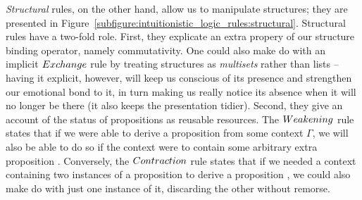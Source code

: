\textit{Structural} rules, on the other hand, allow us to manipulate structures; they are presented in Figure~\ref{subfigure:intuitionistic_logic_rules:structural}.
Structural rules have a two-fold role.
First, they explicate an extra propery of our structure binding operator, namely commutativity.
One could also make do with an implicit $Exchange{}$ rule by treating structures as \textit{multisets} rather than lists -- having it explicit, however, will keep us conscious of its presence and strengthen our emotional bond to it, in turn making us really notice its absence when it will no longer be there (it also keeps the presentation tidier).
Second, they give an account of the status of propositions as reusable resources.
The $Weakening{}$ rule states that if we were able to derive a proposition  from some context $\Gamma$, we will also be able to do so if the context were to contain some arbitrary extra proposition .
Conversely, the $Contraction{}$ rule states that if we needed a context containing two instances of a proposition  to derive a proposition , we could also make do with just one instance of it, discarding the other without remorse.
%
%


